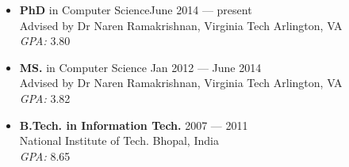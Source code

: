 
%
\begin{itemize}[nosep]
  \setlength\itemsep{-1em}
    \item \textbf{PhD} in Computer Science\hfill June 2014 --- present\\
        Advised by Dr Naren Ramakrishnan, Virginia Tech \hfill Arlington, VA\\
        \textit{GPA:} 3.80 \\
    
    \item \textbf{MS.} in Computer Science \hfill Jan 2012 --- June 2014\\
        Advised by Dr Naren Ramakrishnan, Virginia Tech \hfill Arlington, VA\\
        \textit{GPA:} 3.82 \\
    
    \item \textbf{B.Tech. in Information Tech.} \hfill 2007 --- 2011\\
        National Institute of Tech. \hfill Bhopal, India\\
        \textit{GPA:} 8.65
\end{itemize}

